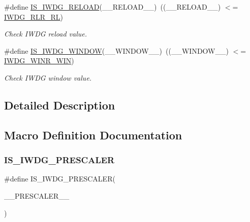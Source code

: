 \begin{DoxyCompactItemize}
\#define \hyperlink{group___i_w_d_g___private___macros_gad7ade0982243f56ba89ff764534f553c}{I\+S\+\_\+\+I\+W\+D\+G\+\_\+\+R\+E\+L\+O\+AD}(\+\_\+\+\_\+\+R\+E\+L\+O\+A\+D\+\_\+\+\_\+)~((\+\_\+\+\_\+\+R\+E\+L\+O\+A\+D\+\_\+\+\_\+) $<$= \hyperlink{group___peripheral___registers___bits___definition_ga87024bbb19f26def4c4c1510b22d3033}{I\+W\+D\+G\+\_\+\+R\+L\+R\+\_\+\+RL})
\begin{DoxyCompactList}\small\item\em Check I\+W\+DG reload value. \end{DoxyCompactList}\item 
\#define \hyperlink{group___i_w_d_g___private___macros_ga4ef7fac65e2c0d6a9c66c9899b9eb195}{I\+S\+\_\+\+I\+W\+D\+G\+\_\+\+W\+I\+N\+D\+OW}(\+\_\+\+\_\+\+W\+I\+N\+D\+O\+W\+\_\+\+\_\+)~((\+\_\+\+\_\+\+W\+I\+N\+D\+O\+W\+\_\+\+\_\+) $<$= \hyperlink{group___peripheral___registers___bits___definition_ga9a609548fc74e1d2214de4413081e03d}{I\+W\+D\+G\+\_\+\+W\+I\+N\+R\+\_\+\+W\+IN})
\begin{DoxyCompactList}\small\item\em Check I\+W\+DG window value. \end{DoxyCompactList}\end{DoxyCompactItemize}


\subsection{Detailed Description}


\subsection{Macro Definition Documentation}
\mbox{\label{group___i_w_d_g___private___macros_ga2b1af237dca5c067fbc9088185cb8185}} 
\subsubsection{\texorpdfstring{I\+S\+\_\+\+I\+W\+D\+G\+\_\+\+P\+R\+E\+S\+C\+A\+L\+ER}{IS\_IWDG\_PRESCALER}}
{\footnotesize\ttfamily \#define I\+S\+\_\+\+I\+W\+D\+G\+\_\+\+P\+R\+E\+S\+C\+A\+L\+ER(\begin{DoxyParamCaption}\item[{}]{\+\_\+\+\_\+\+P\+R\+E\+S\+C\+A\+L\+E\+R\+\_\+\+\_\+ }\end{DoxyParamCaption})}

